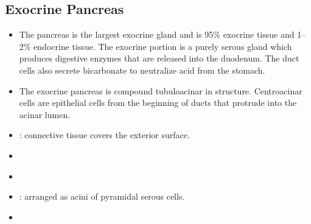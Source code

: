 \begin{itemize}
  \subsection{Exocrine Pancreas}\label{Exocrine Pancreas}
  \begin{itemize}
    \item The pancreas is the largest exocrine gland and is 95\% exocrine tissue and 1--2\% endocrine tissue. The exocrine portion is a purely serous gland which produces digestive enzymes that are released into the duodenum. The duct cells also secrete bicarbonate to neutralize acid from the stomach.
    \item The exocrine pancreas is compound tubuloacinar in structure. Centroacinar cells are epithelial cells from the beginning of ducts that protrude into the acinar lumen.
    
    
  \end{itemize}
  \begin{multicols}{2}
  \begin{itemize}
    \item {}: connective tissue covers the exterior surface.
    
    \begin{center}
    \end{center}
    
    \item {}
    
    \begin{center}
    \end{center}
    
    \item {}
    
    \begin{center}
    \end{center}
    
    \item {}: arranged as acini of pyramidal serous cells. 
    
    \begin{center}
    \end{center}
    
    \item {}
    

\end{itemize}
\end{multicols}
\end{itemize}
